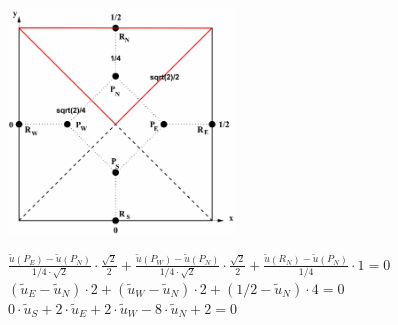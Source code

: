\begin{minipage}{6cm}
	\includegraphics[width=6cm]{Content/Numerik/FVM2.png}
\end{minipage}
\hfill
\begin{minipage}{12cm}

 $\frac{\tilde{u}(P_E)-\tilde{u}(P_N)}{1/4\cdot\sqrt{2}}\cdot\frac{\sqrt{2}}{2}+\frac{\tilde{u}(P_W)-\tilde{u}(P_N)}{1/4\cdot\sqrt{2}}\cdot\frac{\sqrt{2}}{2}+\frac{\tilde{u}(R_N)-\tilde{u}(P_N)}{1/4}\cdot 1=0$\\
 
 $(\tilde{u}_E-\tilde{u}_N)\cdot 2 + (\tilde{u}_W-\tilde{u}_N)\cdot 2 + (1/2-\tilde{u}_N)\cdot 4=0$\\
 
 $0\cdot\tilde{u}_S+2\cdot\tilde{u}_E+2\cdot\tilde{u}_W-8\cdot\tilde{u}_N+2=0$
 

\end{minipage}



